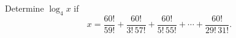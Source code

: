 Determine $\log_4 x$ if
\[
x=\dfrac{60!}{59!}+\dfrac{60!}{3!\,57!}+\dfrac{60!}{5!\,55!}+\cdots+\dfrac{60!}{29!\,31!}.
\]
